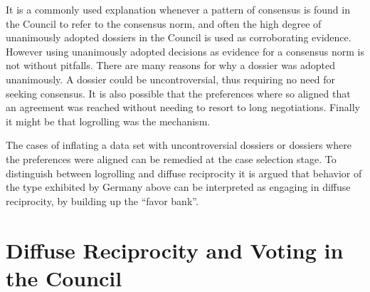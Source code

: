It is a commonly used explanation whenever a pattern of consensus is found in the Council to refer to the consensus norm, and often the high degree of unanimously adopted dossiers in the Council is used as corroborating evidence. However using unanimously adopted decisions as evidence for a consensus norm is not without pitfalls. There are many reasons for why a dossier was adopted unanimously. A dossier could be uncontroversial, thus requiring no need for seeking consensus. It is also possible that the preferences where so aligned that an agreement was reached without needing to resort to long negotiations. Finally it might be that logrolling was the mechanism. 

The cases of inflating a data set with uncontroversial dossiers or dossiers where the preferences were aligned can be remedied at the case selection stage. To distinguish between logrolling and diffuse reciprocity it is argued that behavior of the type exhibited by Germany above can be interpreted as engaging in diffuse reciprocity, by building up the ``favor bank''. 


\section{Diffuse Reciprocity and Voting in the Council}

